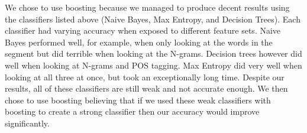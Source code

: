 We chose to use boosting because we managed to produce decent results using the classifiers listed above (Naive Bayes, Max Entropy, and Decision Trees). Each classifier had varying accuracy when exposed to different feature sets. Naive Bayes performed well, for example, when only looking at the words in the segment but did terrible when looking at the N-grams. Decision trees however did well when looking at N-grams and POS tagging. Max Entropy did very well when looking at all three at once, but took an exceptionally long time. Despite our results, all of these classifiers are still weak and not accurate enough. We then chose to use boosting believing that if we used these weak classifiers with boosting to create a strong classifier then our accuracy would improve significantly.
